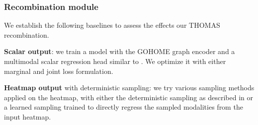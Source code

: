 \documentclass{article} \usepackage{iclr2022_conference,times}
\begin{document}
\subsubsection{Recombination module}

We establish the following baselines to assess the effects our THOMAS recombination.


\textbf{Scalar output}: we train a model with the GOHOME graph encoder and a multimodal scalar regression head similar to \cite{liang2020learning}. We optimize it with either marginal and joint loss formulation.

\textbf{Heatmap output} with deterministic sampling: we try various sampling methods applied on the heatmap, with either the deterministic sampling as described in \cite{gilles2021gohome} or a learned sampling trained to directly regress the sampled modalities from the input heatmap.
\end{document}
